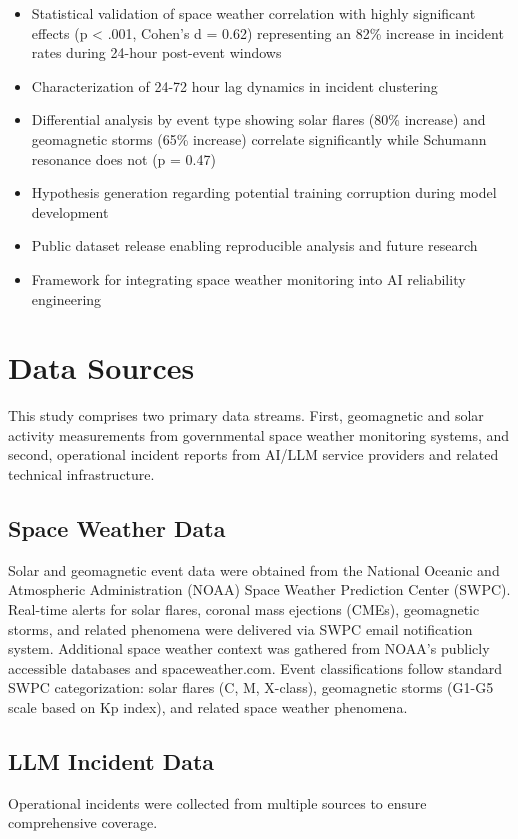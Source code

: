\documentclass[11pt,a4paper]{article}
\begin{document}
\begin{itemize}
\item Statistical validation of space weather correlation with highly significant effects (p < .001, Cohen's d = 0.62) representing an 82\% increase in incident rates during 24-hour post-event windows
\item Characterization of 24-72 hour lag dynamics in incident clustering
\item Differential analysis by event type showing solar flares (80\% increase) and geomagnetic storms (65\% increase) correlate significantly while Schumann resonance does not (p = 0.47)
\item Hypothesis generation regarding potential training corruption during model development
\item Public dataset release enabling reproducible analysis and future research
\item Framework for integrating space weather monitoring into AI reliability engineering
\end{itemize}

\section{Data Sources}
This study comprises two primary data streams. First, geomagnetic and solar activity measurements from governmental space weather monitoring systems, and second, operational incident reports from AI/LLM service providers and related technical infrastructure.

\subsection{Space Weather Data}
Solar and geomagnetic event data were obtained from the National Oceanic and Atmospheric Administration (NOAA) Space Weather Prediction Center (SWPC). \cite{noaa_kp} \cite{noaa_xray} Real-time alerts for solar flares, coronal mass ejections (CMEs), geomagnetic storms, and related phenomena were delivered via SWPC email notification system. Additional space weather context was gathered from NOAA's publicly accessible databases and spaceweather.com. \cite{spaceweather} Event classifications follow standard SWPC categorization: solar flares (C, M, X-class), geomagnetic storms (G1-G5 scale based on Kp index), and related space weather phenomena. \cite{kyoto}

\subsection{LLM Incident Data}
Operational incidents were collected from multiple sources to ensure comprehensive coverage.
\end{document}
